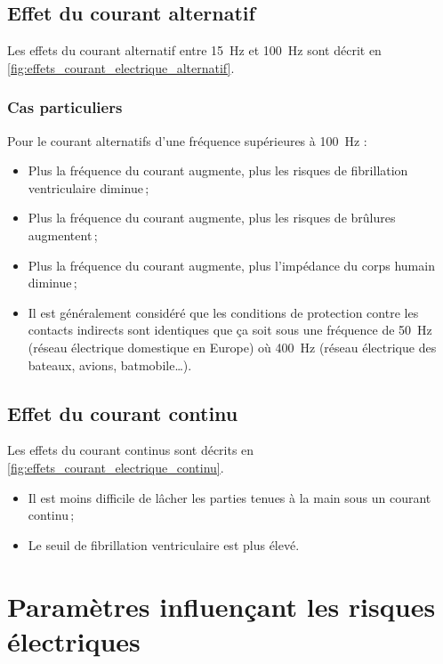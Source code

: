 \documentclass[a4paper, 11pt, twoside, fleqn]{memoir}
\begin{document}
\subsection{Effet du courant alternatif}

Les effets du courant alternatif entre \SI{15}{\hertz} et \SI{100}{\hertz} sont décrit en \autoref{fig:effets_courant_electrique_alternatif}. 



\subsubsection{Cas particuliers}

Pour le courant alternatifs d'une fréquence supérieures à \SI{100}{\hertz} :

\begin{itemize}
\item Plus la fréquence du courant augmente, plus les risques de fibrillation ventriculaire diminue\,;
\item Plus la fréquence du courant augmente, plus les risques de brûlures augmentent\,;
\item Plus la fréquence du courant augmente, plus l'impédance du corps humain diminue\,;
\item Il est généralement considéré que les conditions de protection contre les contacts indirects sont identiques que ça soit sous une fréquence de \SI{50}{\hertz} (réseau électrique domestique en Europe) où \SI{400}{\hertz} (réseau électrique des bateaux, avions, batmobile\ldots).
\end{itemize}

\subsection{Effet du courant continu}

Les effets du courant continus sont décrits en \autoref{fig:effets_courant_electrique_continu}.



\begin{itemize}
\item Il est moins difficile de lâcher les parties tenues à la main sous un courant continu\,;
\item Le seuil de fibrillation ventriculaire est plus élevé.
\end{itemize}

\section{Paramètres influençant les risques électriques}
\end{document}

